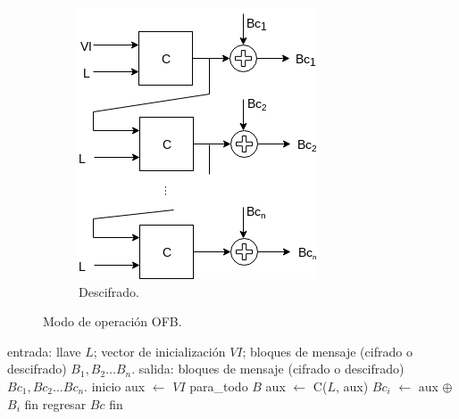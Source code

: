 \begin{figure}[H]
\begin{subfigure}{0.45\textwidth}
\begin{center}
          \includegraphics[width=0.7\linewidth]
            {contenidos/antecedentes/modos/diagramas/modo_ofb_inverso.png}
          \caption{Descifrado.}
      \end{center}
  \end{subfigure}
  \caption{Modo de operación OFB.}
\end{figure}

\begin{pseudocodigo}[caption={Modo de operación OFB (cifrado y descifrado).}]
  entrada: llave $ L $; vector de inicialización $ VI $;
           bloques de mensaje (cifrado o descifrado) $ B_1, B_2 \dots B_n $.
   salida: bloques de mensaje (cifrado o descifrado) $ Bc_1, Bc_2 \dots Bc_n $.
  inicio
    aux $\gets$ $ VI $
    para_todo $B$
      aux $\gets$ C($L$, aux)
      $Bc_i$ $\gets$  aux $\oplus$ $B_i$
    fin
    regresar $Bc$
  fin
\end{pseudocodigo}
